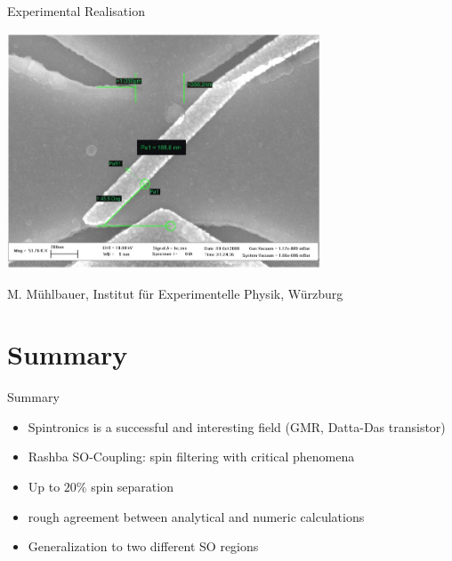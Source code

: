 \documentclass{beamer}
\begin{document}
\begin{frame}{Experimental Realisation}
    \begin{center}
        \includegraphics[width=0.7\textwidth]{beamsplitter2.jpg}

        M. Mühlbauer, Institut für Experimentelle Physik, Würzburg
    \end{center}
\end{frame}

\section{Summary}

\begin{frame}{Summary}
    \begin{itemize}
        \item Spintronics is a successful and interesting field (GMR,
            Datta-Das transistor)
        \item Rashba SO-Coupling: spin filtering with critical phenomena
        \item Up to $20\%$ spin separation
        \item rough agreement between analytical and numeric calculations
        \item Generalization to two different SO regions
    \end{itemize}

\end{frame}
\end{document}
